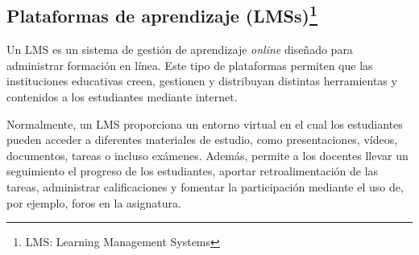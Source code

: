 \subsection[Plataformas de aprendizaje (LMSs)]{Plataformas de aprendizaje (LMSs)\footnote{LMS: Learning Management Systems}}
Un LMS es un sistema de gestión de aprendizaje \textit{online} diseñado para administrar formación en línea.
Este tipo de plataformas permiten que las instituciones educativas creen, gestionen y distribuyan distintas herramientas y contenidos a los estudiantes mediante internet.

Normalmente, un LMS proporciona un entorno virtual en el cual los estudiantes pueden acceder a diferentes materiales de estudio, como presentaciones, vídeos, documentos, tareas o incluso exámenes.
Además, permite a los docentes llevar un seguimiento el progreso de los estudiantes, aportar retroalimentación de las tareas, administrar calificaciones y fomentar la participación mediante el uso de, por ejemplo, foros en la asignatura.

